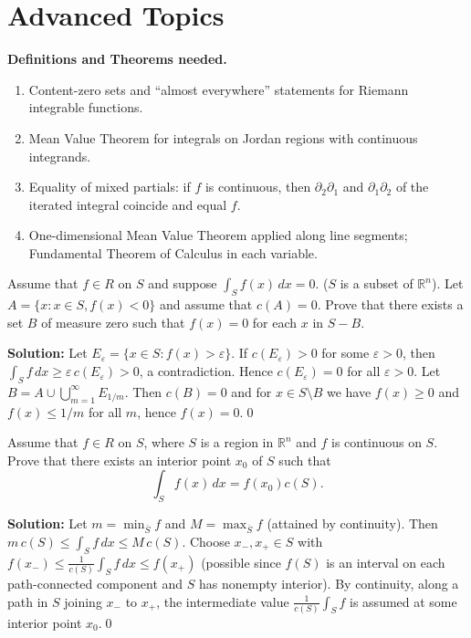\section{Advanced Topics}
\noindent\textbf{Definitions and Theorems needed.}
\begin{enumerate}[label=(\roman*)]
    \item Content-zero sets and ``almost everywhere'' statements for Riemann integrable functions.
    \item Mean Value Theorem for integrals on Jordan regions with continuous integrands.
    \item Equality of mixed partials: if $f$ is continuous, then $\partial_2\partial_1$ and $\partial_1\partial_2$ of the iterated integral coincide and equal $f$.
    \item One-dimensional Mean Value Theorem applied along line segments; Fundamental Theorem of Calculus in each variable.
\end{enumerate}



\begin{problembox}
Assume that \( f \in R \) on \( S \) and suppose \( \int_S f(x) \, dx = 0 \). (\( S \) is a subset of \( \mathbb{R}^n \)). Let \( A = \{ x : x \in S, f(x) < 0 \} \) and assume that \( c(A) = 0 \). Prove that there exists a set \( B \) of measure zero such that \( f(x) = 0 \) for each \( x \) in \( S - B \).
\end{problembox}

\bigskip\noindent\textbf{Solution:}
Let $E_\varepsilon=\{x\in S:f(x)>\varepsilon\}$. If $c(E_\varepsilon)>0$ for some $\varepsilon>0$, then $\int_S f\,dx\ge \varepsilon\,c(E_\varepsilon)>0$, a contradiction. Hence $c(E_\varepsilon)=0$ for all $\varepsilon>0$. Let $B=A\cup\bigcup_{m=1}^\infty E_{1/m}$. Then $c(B)=0$ and for $x\in S\setminus B$ we have $f(x)\ge 0$ and $f(x)\le 1/m$ for all $m$, hence $f(x)=0$.\qed


\begin{problembox}
Assume that \( f \in R \) on \( S \), where \( S \) is a region in \( \mathbb{R}^n \) and \( f \) is continuous on \( S \). Prove that there exists an interior point \( x_0 \) of \( S \) such that
\[\int_S f(x) \, dx = f(x_0)c(S).\]
\end{problembox}

\bigskip\noindent\textbf{Solution:}
Let $m=\min_{\overline S} f$ and $M=\max_{\overline S} f$ (attained by continuity). Then $m\,c(S)\le \int_S f\,dx\le M\,c(S)$. Choose $x_-,x_+\in S$ with $f(x_-)\le \frac{1}{c(S)}\int_S f\,dx\le f(x_+)$ (possible since $f(S)$ is an interval on each path-connected component and $S$ has nonempty interior). By continuity, along a path in $S$ joining $x_-$ to $x_+$, the intermediate value $\frac{1}{c(S)}\int_S f$ is assumed at some interior point $x_0$.\qed


